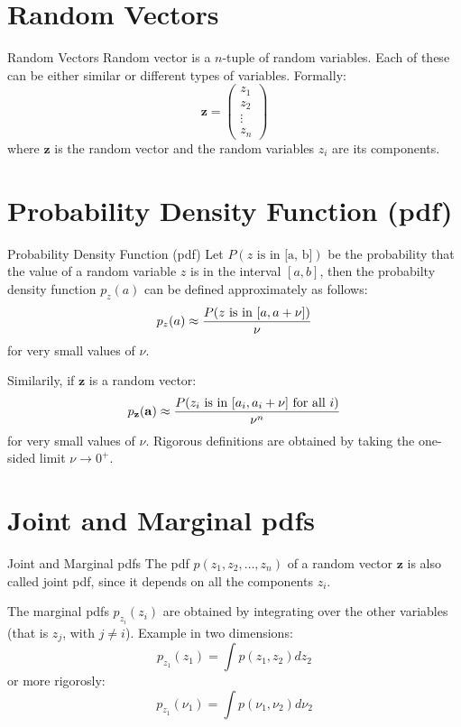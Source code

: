 \documentclass{beamer}
\begin{document}
\section{Random Vectors}

\begin{frame}{Random Vectors}
  Random vector is a $n$-tuple of random variables. Each of these can be either
  similar or different types of variables. Formally:
  \[ \mathbf{z} =  \begin{pmatrix} z_1 \\ z_2 \\ \vdots \\ z_n \end{pmatrix} \]
  where $\mathbf{z}$ is the random vector and the random variables $z_i$ are
  its components.
\end{frame}

\section{Probability Density Function (pdf)}

\begin{frame}{Probability Density Function (pdf)}
  Let $P(\text{$z$ is in [a, b]})$ be the probability that the value of a
  random variable $z$ is in the interval $[a, b]$, then the probabilty density
  function $p_z(a)$ can be defined approximately as follows:
  \[ p_z(a) \approx \frac{P(\textnormal{$z$ is in $[a, a + \nu]$})}{\nu}\]
  for very small values of $\nu$.

  Similarily, if $\mathbf{z}$ is a random vector:
  \[ p_{\mathbf{z}}(\mathbf{a}) \approx
  \frac{P(\textnormal{$z_i$ is in $[a_i, a_i + \nu]$ for all $i$})}{\nu^n}\]
  for very small values of $\nu$. Rigorous definitions are obtained by taking
  the one-sided limit $\nu \to 0^+$.
\end{frame}

\section{Joint and Marginal pdfs}

\begin{frame}{Joint and Marginal pdfs}
  The pdf $p(z_1, z_2, \ldots, z_n)$ of a random vector $\mathbf{z}$ is also
  called joint pdf, since it depends on all the components $z_i$.

  The marginal pdfs $p_{z_i}(z_i)$ are obtained by integrating over the other
  variables (that is $z_j$, with $j \ne i$). Example in two dimensions:
  \[ p_{z_1}(z_1) =  \int p(z_1, z_2)dz_2\]
  or more rigorosly:
  \[ p_{z_1}(\nu_1) =  \int p(\nu_1, \nu_2)d\nu_2\]
\end{frame}
\end{document}

